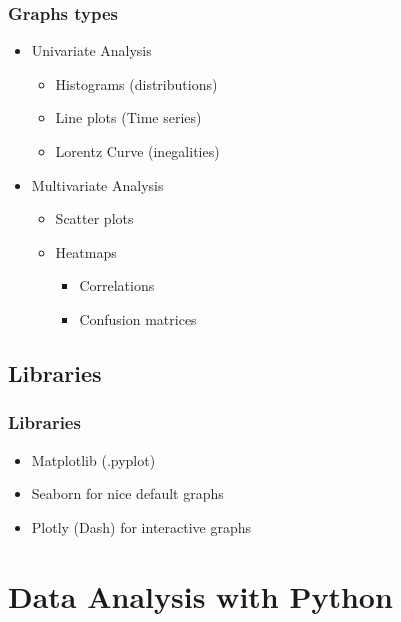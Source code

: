 \begin{frame}\frametitle{Graphs types}
   \begin{itemize}
      \item Univariate Analysis
      \begin{itemize}
         \item Histograms (distributions)
         \item Line plots (Time series)
         \item Lorentz Curve (inegalities)
      \end{itemize}
      \item Multivariate Analysis
      \begin{itemize}
         \item Scatter plots
         \item Heatmaps
         \begin{itemize}
            \item Correlations
            \item Confusion matrices
         \end{itemize}
      \end{itemize}
   \end{itemize}
\end{frame}

\subsection{Libraries}

\begin{frame}\frametitle{Libraries}
   \begin{itemize}
      \item Matplotlib (.pyplot)
      \item Seaborn for nice default graphs
      \item Plotly (Dash) for interactive graphs
   \end{itemize}
\end{frame}



\section{Data Analysis with Python}



